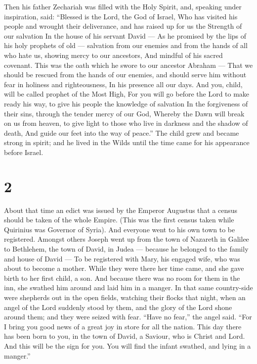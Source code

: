  Then his father Zechariah was filled with the Holy Spirit,
and, speaking under inspiration, said:  ``Blessed is the
Lord, the God of Israel, Who has visited his people and wrought their
deliverance,  and has raised up for us the Strength of our
salvation In the house of his servant David ---  As he
promised by the lips of his holy prophets of old --- 
salvation from our enemies and from the hands of all who hate us,
 showing mercy to our ancestors, And mindful of his sacred
covenant.  This was the oath which he swore to our ancestor
Abraham ---  That we should be rescued from the hands of
our enemies,  and should serve him without fear in holiness
and righteousness, In his presence all our days.  And you,
child, will be called prophet of the Most High, For you will go before
the Lord to make ready his way,  to give his people the
knowledge of salvation In the forgiveness of their sins, 
through the tender mercy of our God, Whereby the Dawn will break on us
from heaven,  to give light to those who live in darkness
and the shadow of death, And guide our feet into the way of peace.''
 The child grew and became strong in spirit; and he lived
in the Wilds until the time came for his appearance before Israel.

\hypertarget{section-1}{%
\section{2}\label{section-1}}

 About that time an edict was issued by the Emperor Augustus
that a census should be taken of the whole Empire.  (This
was the first census taken while Quirinius was Governor of Syria).
 And everyone went to his own town to be registered.
 Amongst others Joseph went up from the town of Nazareth in
Galilee to Bethlehem, the town of David, in Judea --- because he
belonged to the family and house of David ---  To be
registered with Mary, his engaged wife, who was about to become a
mother.  While they were there her time came, 
and she gave birth to her first child, a son. And because there was no
room for them in the inn, she swathed him around and laid him in a
manger.  In that same country-side were shepherds out in the
open fields, watching their flocks that night,  when an
angel of the Lord suddenly stood by them, and the glory of the Lord
shone around them; and they were seized with fear.  ``Have
no fear,'' the angel said. ``For I bring you good news of a great joy in
store for all the nation.  This day there has been born to
you, in the town of David, a Saviour, who is Christ and Lord.
 And this will be the sign for you. You will find the
infant swathed, and lying in a manger.''

